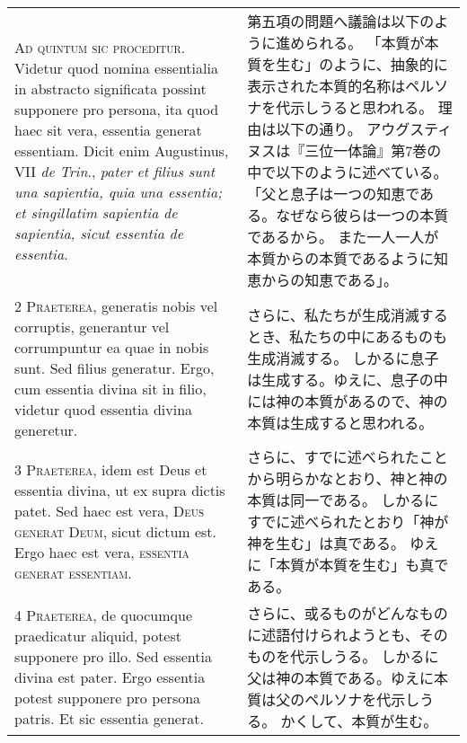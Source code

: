 \documentclass[10pt]{jsarticle} %
\begin{document}
\begin{longtable}{p{21em}p{21em}}

\textsc{Ad quintum sic proceditur}. Videtur quod nomina essentialia in
abstracto significata possint supponere pro persona, ita quod haec sit vera,
essentia generat essentiam. Dicit enim Augustinus, VII \textit{de Trin}., \textit{pater et
filius sunt una sapientia, quia una essentia; et singillatim sapientia de
sapientia, sicut essentia de essentia}.


&

第五項の問題へ議論は以下のように進められる。
「本質が本質を生む」のように、抽象的に表示された本質的名称はペルソナを代示しうると思われる。
理由は以下の通り。
アウグスティヌスは『三位一体論』第7巻の中で以下のように述べている。
「父と息子は一つの知恵である。なぜなら彼らは一つの本質であるから。
また一人一人が本質からの本質であるように知恵からの知恵である」。

\\

2 \textsc{Praeterea}, generatis nobis vel corruptis, generantur vel
corrumpuntur ea quae in nobis sunt. Sed filius generatur. Ergo, cum essentia
divina sit in filio, videtur quod essentia divina generetur.


&

さらに、私たちが生成消滅するとき、私たちの中にあるものも生成消滅する。
しかるに息子は生成する。ゆえに、息子の中には神の本質があるので、神の本質は生成すると思われる。

\\

3 \textsc{Praeterea}, idem est Deus et essentia divina, ut ex supra dictis
patet. Sed haec est vera, \textsc{Deus generat Deum}, sicut dictum est. Ergo haec est
vera, \textsc{essentia generat essentiam}.


&

さらに、すでに述べられたことから明らかなとおり、神と神の本質は同一である。
しかるにすでに述べられたとおり「神が神を生む」は真である。
ゆえに「本質が本質を生む」も真である。

\\

4 \textsc{Praeterea}, de quocumque praedicatur aliquid, potest supponere pro
illo. Sed essentia divina est pater. Ergo essentia potest supponere pro persona
patris. Et sic essentia generat.


&

さらに、或るものがどんなものに述語付けられようとも、そのものを代示しうる。
しかるに父は神の本質である。ゆえに本質は父のペルソナを代示しうる。
かくして、本質が生む。


\end{longtable}
\end{document}
